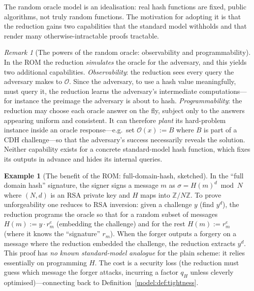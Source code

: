 \documentclass[11pt,a4paper]{article}
\theoremstyle{definition}
\newtheorem{example}[theorem]{Example}
\theoremstyle{remark}
\newtheorem{remark}[theorem]{Remark}
\newcommand{\Z}{\ensuremath{\mathbb{Z}}}
\begin{document}
The random oracle model is an idealisation: real hash functions are fixed, public
algorithms, not truly random functions. The motivation for adopting it is that the
reduction gains two capabilities that the standard model withholds and that
render many otherwise-intractable proofs tractable.

\begin{remark}[The powers of the random oracle: observability and programmability]\label{model:rem:rom-powers}
In the ROM the reduction \emph{simulates} the oracle for the adversary, and this
yields two additional capabilities.
\emph{Observability}: the reduction sees every query the adversary makes to
\(\mathcal{O}\). Since the adversary, to use a hash value meaningfully, must query
it, the reduction learns the adversary's intermediate computations---for instance
the preimage the adversary is about to hash. \emph{Programmability}: the reduction
may choose each oracle answer on the fly, subject only to the answers appearing
uniform and consistent. It can therefore \emph{plant} its hard-problem instance
inside an oracle response---e.g.\ set \(\mathcal{O}(x) := B\) where \(B\) is part
of a CDH challenge---so that the adversary's success necessarily reveals the
solution. Neither capability exists for a concrete standard-model hash function, which
fixes its outputs in advance and hides its internal queries.
\end{remark}

\begin{example}[The benefit of the ROM: full-domain-hash, sketched]\label{model:exp:rom-fdh}
In the ``full domain hash'' signature, the signer signs a message \(m\) as
\(\sigma = H(m)^{d} \bmod N\) where \((N,d)\) is an RSA private key and \(H\) maps
into \(\Z/N\Z\). To prove unforgeability one reduces to RSA inversion: given a
challenge \(y\) (find \(y^{d}\)), the reduction programs the oracle so that for a
random subset of messages \(H(m) := y \cdot r_m^{e}\) (embedding the challenge)
and for the rest \(H(m) := r_m^{e}\) (where it knows the ``signature''
\(r_m\)). When the forger outputs a forgery on a message where the reduction
embedded the challenge, the reduction extracts \(y^{d}\). This proof has \emph{no known
standard-model analogue} for the plain scheme: it relies essentially on
programming \(H\). The cost is a security loss (the reduction must guess which
message the forger attacks, incurring a factor \(q_H\) unless cleverly
optimised)---connecting back to Definition~\ref{model:def:tightness}.
\end{example}
\end{document}

